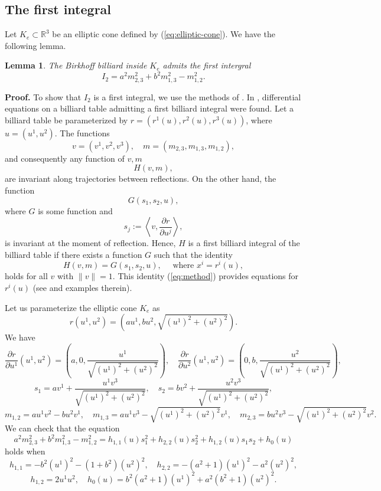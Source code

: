\documentclass[12pt]{article}
\newtheorem{lemma}{Lemma}
\begin{document}
\subsection{The first integral}
Let $K_e \subset \mathbb{R}^3$ be an elliptic cone defined by (\ref{eq:elliptic-cone}).
We have the following lemma.
\begin{lemma}\label{lem:int-ell}
	The Birkhoff billiard inside $K_e$ 
  admits the first intergral
	$$
  I_2 = 
  a^2 m_{2,3}^2 + b^2 m_{1,3}^2 - m_{1,2}^2.
	$$
\end{lemma}
\textbf{Proof.}
To show that $I_2$ is a first integral, we use the methods of \cite{DM}.
In \cite{DM}, differential equations on a billiard table admitting a first billiard integral were found.
Let a billiard table be parameterized by 
$ r = (r^1(u), r^2(u), r^3(u)) $, 
where $ u = (u^1, u^2)$.
The functions
$$
v = (v^1, v^2, v^3), \quad m = (m_{2,3}, m_{1,3}, m_{1,2}),
$$
and consequently any function of $v, m$
$$
H(v, m),
$$
are invariant along trajectories between reflections. On the other hand, the function
$$
G(s_1, s_2, u),
$$
where $G$ is some function and
$$
s_j := \left\langle v, \frac{\partial r}{\partial u^j} \right\rangle,
$$
is invariant at the moment of reflection. 
Hence, $H$ is a first billiard integral of the billiard table if there exists a function $G$ such that the identity
\begin{equation}\label{eq:method}
H(v, m) = G(s_1, s_2, u),
\quad 
\text{ where } x^i = r^i(u),
\end{equation}
holds for all $v$ with $ \|v\| = 1$. 
This identity (\ref{eq:method}) provides equations for $r^i(u)$ (see \cite{DM} and examples therein).

Let us parameterize the elliptic cone $K_e$ as 
$$
r(u^1, u^2) = (a u^1,b u^2, \sqrt{(u^1)^2 + (u^2)^2}).
$$
We have
$$
\frac{\partial r}{\partial u^1}(u^1, u^2) = (a, 0, \frac{u^1}{\sqrt{(u^1)^2 + (u^2)^2}}),
\quad 
\frac{\partial r}{\partial u^2}(u^1, u^2) = (0, b, \frac{u^2}{\sqrt{(u^1)^2 + (u^2)^2}}),
$$
$$
s_1 = a v^1 + \frac{u^1 v^3}{\sqrt{(u^1)^2 + (u^2)^2}}, 
\quad 
s_2 = b v^2 +  \frac{u^2 v^3}{\sqrt{(u^1)^2 + (u^2)^2}},
$$
$$
m_{1,2} = a u^1 v^2 - b u^2 v^1 , 
\quad 
m_{1,3} = a u^1 v^3 - \sqrt{(u^1)^2+ (u^2)^2} v^1 , 
\quad  
m_{2,3} = b u^2 v^3 - \sqrt{(u^1)^2+ (u^2)^2} v^2 .
$$
We can check that the equation 
$$
a^2 m_{2,3}^2 + b^2 m_{1,3}^2 -  m_{1,2}^2 = h_{1,1}(u) s_1^2 +  h_{2,2}(u) s_2^2  + h_{1,2}(u) s_1 s_2 + h_0(u) 
$$
holds when 
$$ 
h_{1,1} = -b^2 (u^1)^2 - (1+b^2) (u^2)^2 , 
\quad 
h_{2,2}= - (a^2+1) (u^1)^2 - a^2 (u^2)^2 ,
$$
$$
h_{1,2}= 2 u^1 u^2,  
\quad 
h_0(u)= b^2(a^2+1)(u^1)^2+ a^2(b^2+1) (u^2)^2 .
$$
\end{document}

